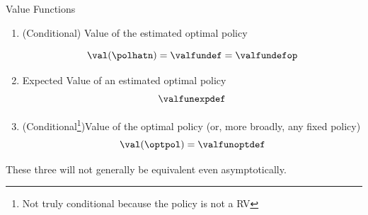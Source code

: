 \documentclass[aspectratio=169, professionalfonts]{beamer}
\begin{document}
\begin{frame}{Value Functions}
	\begin{enumerate}
		\item (Conditional) Value of the estimated optimal policy

		      $$\val(\polhatn) = \valfundef = \valfundefop$$

		      \vfill \pause

		\item Expected Value of an estimated optimal policy
		      $$\valfunexpdef$$

		      \vfill \pause

		\item (Conditional\footnote{Not truly conditional because the
			      policy is not a RV})Value of the optimal policy (or, more broadly, any fixed policy)
		      $$\val(\optpol) = \valfunoptdef$$
	\end{enumerate}

	\vfill \pause
	These three will not generally be equivalent even asymptotically.
\end{frame}
\end{document}
